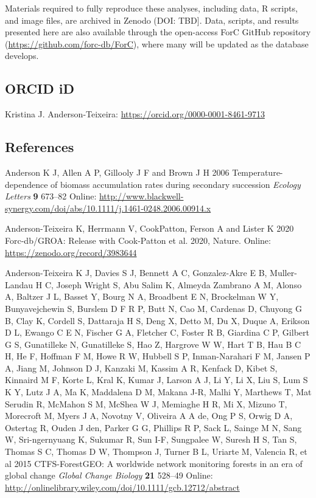 \documentclass[
]{article}
\begin{document}
Materials required to fully reproduce these analyses, including data, R
scripts, and image files, are archived in Zenodo (DOI: TBD{]}. Data,
scripts, and results presented here are also available through the
open-access ForC GitHub repository
(\url{https://github.com/forc-db/ForC}), where many will be updated as
the database develops.

\hypertarget{orcid-id}{%
\subsection{ORCID iD}\label{orcid-id}}

Kristina J. Anderson-Teixeira:
\url{https://orcid.org/0000-0001-8461-9713}

\hypertarget{references}{%
\subsection*{References}\label{references}}

\hypertarget{refs}{}
\leavevmode\hypertarget{ref-anderson_temperature-dependence_2006}{}%
Anderson K J, Allen A P, Gillooly J F and Brown J H 2006
Temperature-dependence of biomass accumulation rates during secondary
succession \emph{Ecology Letters} \textbf{9} 673--82 Online:
\url{http://www.blackwell-synergy.com/doi/abs/10.1111/j.1461-0248.2006.00914.x}

\leavevmode\hypertarget{ref-anderson-teixeira_forc-dbgroa_2020}{}%
Anderson-Teixeira K, Herrmann V, CookPatton, Ferson A and Lister K 2020
Forc-db/GROA: Release with Cook-Patton et al. 2020, Nature. Online:
\url{https://zenodo.org/record/3983644}

\leavevmode\hypertarget{ref-anderson-teixeira_ctfs-forestgeo_2015}{}%
Anderson-Teixeira K J, Davies S J, Bennett A C, Gonzalez-Akre E B,
Muller-Landau H C, Joseph Wright S, Abu Salim K, Almeyda Zambrano A M,
Alonso A, Baltzer J L, Basset Y, Bourg N A, Broadbent E N, Brockelman W
Y, Bunyavejchewin S, Burslem D F R P, Butt N, Cao M, Cardenas D, Chuyong
G B, Clay K, Cordell S, Dattaraja H S, Deng X, Detto M, Du X, Duque A,
Erikson D L, Ewango C E N, Fischer G A, Fletcher C, Foster R B, Giardina
C P, Gilbert G S, Gunatilleke N, Gunatilleke S, Hao Z, Hargrove W W,
Hart T B, Hau B C H, He F, Hoffman F M, Howe R W, Hubbell S P,
Inman-Narahari F M, Jansen P A, Jiang M, Johnson D J, Kanzaki M, Kassim
A R, Kenfack D, Kibet S, Kinnaird M F, Korte L, Kral K, Kumar J, Larson
A J, Li Y, Li X, Liu S, Lum S K Y, Lutz J A, Ma K, Maddalena D M, Makana
J-R, Malhi Y, Marthews T, Mat Serudin R, McMahon S M, McShea W J,
Memiaghe H R, Mi X, Mizuno T, Morecroft M, Myers J A, Novotny V,
Oliveira A A de, Ong P S, Orwig D A, Ostertag R, Ouden J den, Parker G
G, Phillips R P, Sack L, Sainge M N, Sang W, Sri-ngernyuang K, Sukumar
R, Sun I-F, Sungpalee W, Suresh H S, Tan S, Thomas S C, Thomas D W,
Thompson J, Turner B L, Uriarte M, Valencia R, et al 2015
CTFS-ForestGEO: A worldwide network monitoring forests in an era of
global change \emph{Global Change Biology} \textbf{21} 528--49 Online:
\url{http://onlinelibrary.wiley.com/doi/10.1111/gcb.12712/abstract}
\end{document}
